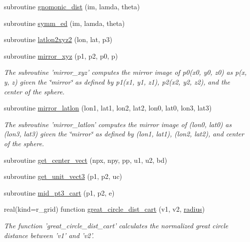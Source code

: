\begin{DoxyCompactItemize}
\item 
subroutine \hyperlink{classfv__grid__utils__mod_aa623c32b277db71d89bc8cb08ee516e7}{gnomonic\-\_\-dist} (im, lamda, theta)
\item 
subroutine \hyperlink{classfv__grid__utils__mod_ae7d3472ec567a8e2c2e903c6ac4ea76a}{symm\-\_\-ed} (im, lamda, theta)
\item 
subroutine \hyperlink{classfv__grid__utils__mod_a77621e212e7499d962d229c963e59845}{latlon2xyz2} (lon, lat, p3)
\item 
subroutine \hyperlink{classfv__grid__utils__mod_aa1a6a80b21abe2b3bf38503986d70dab}{mirror\-\_\-xyz} (p1, p2, p0, p)
\begin{DoxyCompactList}\small\item\em The subroutine 'mirror\-\_\-xyz' computes the mirror image of p0(x0, y0, z0) as p(x, y, z) given the \char`\"{}mirror\char`\"{} as defined by p1(x1, y1, z1), p2(x2, y2, z2), and the center of the sphere. \end{DoxyCompactList}\item 
subroutine \hyperlink{classfv__grid__utils__mod_a80ae6d53a5af90d7cfbccb3a84089ded}{mirror\-\_\-latlon} (lon1, lat1, lon2, lat2, lon0, lat0, lon3, lat3)
\begin{DoxyCompactList}\small\item\em The subroutine 'mirror\-\_\-latlon' computes the mirror image of (lon0, lat0) as (lon3, lat3) given the \char`\"{}mirror\char`\"{} as defined by (lon1, lat1), (lon2, lat2), and center of the sphere. \end{DoxyCompactList}\item 
subroutine \hyperlink{classfv__grid__utils__mod_a27edcd37dde6bcb21f63e8ce4707461f}{get\-\_\-center\-\_\-vect} (npx, npy, pp, u1, u2, bd)
\item 
subroutine \hyperlink{classfv__grid__utils__mod_a881df1c93c5a86930c8375ee74bb4c27}{get\-\_\-unit\-\_\-vect3} (p1, p2, uc)
\item 
subroutine \hyperlink{classfv__grid__utils__mod_ade00327ae5be7ddd3f1bafc9ff4ee18a}{mid\-\_\-pt3\-\_\-cart} (p1, p2, e)
\item 
real(kind=r\-\_\-grid) function \hyperlink{classfv__grid__utils__mod_ab6684ce79354424c32c3495b9ae6ef23}{great\-\_\-circle\-\_\-dist\-\_\-cart} (v1, v2, \hyperlink{classfv__grid__utils__mod_a9825bfea45f13a48cc658a3df88d3124}{radius})
\begin{DoxyCompactList}\small\item\em The function 'great\-\_\-circle\-\_\-dist\-\_\-cart' calculates the normalized great circle distance between 'v1' and 'v2'. \end{DoxyCompactList}\item 

\end{DoxyCompactItemize}
